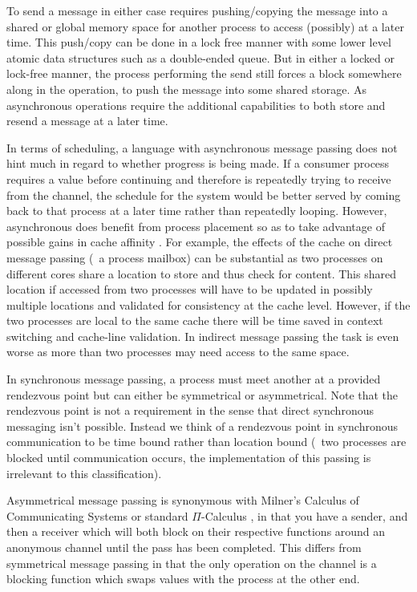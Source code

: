 To send a message in either case requires pushing/copying the 
message into a shared or global memory space for another process to access 
(possibly) at a later time. This push/copy can be done in a lock free manner 
with some lower level atomic data structures such as a double-ended queue. But 
in either a locked or lock-free manner, the process performing the send still 
forces a block somewhere along in the operation, to push the message into some
shared storage. As asynchronous operations require the additional capabilities 
to both store and resend a message at a later time.

In terms of scheduling, a language with asynchronous message passing does not 
hint much in regard to whether progress is being made. If a consumer process
requires a value before continuing and therefore is repeatedly trying to receive 
from the channel, the schedule for the system would be better served by coming 
back to that process at a later time rather than repeatedly looping. However,
asynchronous does benefit from process placement so as to take advantage of 
possible gains in cache affinity \cite{debattista2002cache}. For example, the 
effects of the cache on direct message passing (\eg~a process mailbox) can be 
substantial as two processes on different cores share a location to store and
thus check for content. This shared location if accessed from two processes
will have to be updated in possibly multiple locations and validated for 
consistency at the cache level. However, if the two processes are local to the 
same cache there will be time saved in context switching and cache-line validation. 
In indirect message passing the task is even worse as more than two processes 
may need access to the same space.

In synchronous message passing, a process must meet another at a provided 
rendezvous point but can either be symmetrical or asymmetrical. Note that the 
rendezvous point is not a requirement in the sense that direct synchronous 
messaging isn't possible. Instead we think of a rendezvous point in synchronous 
communication to be time bound rather than location bound (\ie~two processes are 
blocked until communication occurs, the implementation of this passing is 
irrelevant to this classification).

Asymmetrical message passing is synonymous with Milner's Calculus of 
Communicating Systems \cite{milner1982calculus} or standard $\Pi$-Calculus 
\cite{palamidessi1997comparing}, in that you have a sender, and then a receiver 
which will both block on their respective functions around an anonymous channel 
until the pass has been completed. This differs from symmetrical message 
passing in that the only operation on the channel is a blocking function which 
swaps values with the process at the other end.


